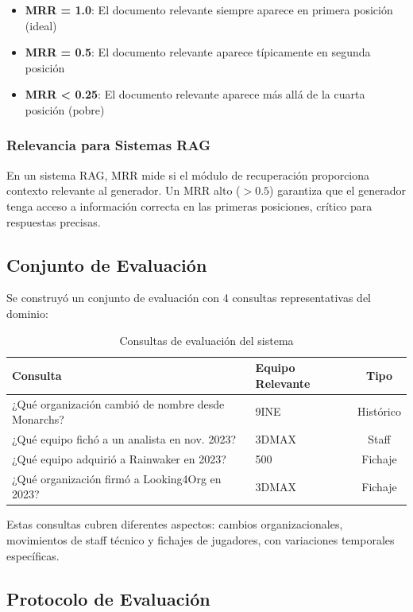 \begin{itemize}
    \item \textbf{MRR = 1.0}: El documento relevante siempre aparece en primera posición (ideal)
    \item \textbf{MRR = 0.5}: El documento relevante aparece típicamente en segunda posición
    \item \textbf{MRR < 0.25}: El documento relevante aparece más allá de la cuarta posición (pobre)
\end{itemize}

\subsubsection{Relevancia para Sistemas RAG}

En un sistema RAG, MRR mide si el módulo de recuperación proporciona contexto relevante al generador. Un MRR alto ($>0.5$) garantiza que el generador tenga acceso a información correcta en las primeras posiciones, crítico para respuestas precisas.

\subsection{Conjunto de Evaluación}

Se construyó un conjunto de evaluación con 4 consultas representativas del dominio:

\begin{table}[ht]
\centering
\caption{Consultas de evaluación del sistema}%
\label{tab:consultas_eval}
\begin{tabular}{llc}
\hline
\textbf{Consulta} & \textbf{Equipo Relevante} & \textbf{Tipo} \\
\hline
¿Qué organización cambió de nombre desde Monarchs? & 9INE & Histórico \\
¿Qué equipo fichó a un analista en nov. 2023? & 3DMAX & Staff \\
¿Qué equipo adquirió a Rainwaker en 2023? & 500 & Fichaje \\
¿Qué organización firmó a Looking4Org en 2023? & 3DMAX & Fichaje \\
\hline
\end{tabular}
\end{table}

Estas consultas cubren diferentes aspectos: cambios organizacionales, movimientos de staff técnico y fichajes de jugadores, con variaciones temporales específicas.

\subsection{Protocolo de Evaluación}

